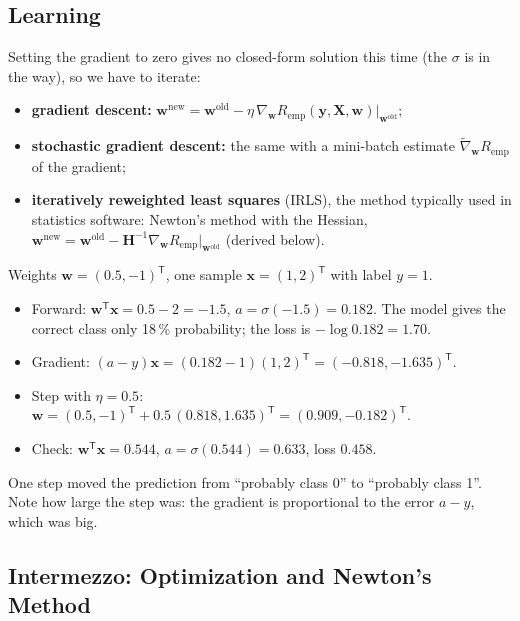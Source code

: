 \documentclass[11pt, oneside]{book}
\newcommand{\grad}{\nabla}               %
\newcommand{\T}{^{\mathsf{T}}}           %
\newcommand{\inv}{^{-1}}                 %
\newcommand{\bx}{\bm{x}}        \newcommand{\by}{\bm{y}}
\newcommand{\bw}{\bm{w}}        \newcommand{\bW}{\bm{W}}
\newcommand{\bX}{\bm{X}}        \newcommand{\bY}{\bm{Y}}
\newcommand{\bH}{\bm{H}}        \newcommand{\bR}{\bm{R}}
\newcommand{\Remp}{R_{\mathrm{emp}}}     %
\let\originalsubsection\subsection
\renewcommand{\subsection}{\Needspace{6\baselineskip}\originalsubsection}
\begin{document}
\subsection{Learning}

Setting the gradient to zero gives no closed-form solution this time (the
$\sigma$ is in the way), so we have to iterate:
\begin{itemize}
  \item \textbf{gradient descent:}
    $\bw^{\text{new}} = \bw^{\text{old}} - \eta\,\grad_{\bw}\Remp(\by, \bX, \bw)|_{\bw^{\text{old}}}$;
  \item \textbf{stochastic gradient descent:} the same with a mini-batch
    estimate $\tilde\grad_{\bw}\Remp$ of the gradient;
  \item \textbf{iteratively reweighted least squares} (IRLS), the method
    typically used in statistics software: Newton's method with the Hessian,
    $\bw^{\text{new}} = \bw^{\text{old}} - \bH\inv\grad_{\bw}\Remp|_{\bw^{\text{old}}}$
    (derived below).
\end{itemize}

\begin{exbox}[title={One gradient step for logistic regression}]
Weights $\bw = (0.5, -1)\T$, one sample $\bx = (1, 2)\T$ with label $y = 1$.
\begin{itemize}
  \item Forward: $\bw\T\bx = 0.5 - 2 = -1.5$, $a = \sigma(-1.5) = 0.182$. The
    model gives the correct class only 18\,\% probability; the loss is
    $-\log 0.182 = 1.70$.
  \item Gradient: $(a - y)\bx = (0.182 - 1)(1, 2)\T = (-0.818, -1.635)\T$.
  \item Step with $\eta = 0.5$: $\bw = (0.5, -1)\T + 0.5\,(0.818, 1.635)\T
    = (0.909, -0.182)\T$.
  \item Check: $\bw\T\bx = 0.544$, $a = \sigma(0.544) = 0.633$, loss $0.458$.
\end{itemize}
One step moved the prediction from ``probably class 0'' to ``probably class
1''. Note how large the step was: the gradient is proportional to the error
$a - y$, which was big.
\end{exbox}

\subsection{Intermezzo: Optimization and Newton's Method}
\end{document}
